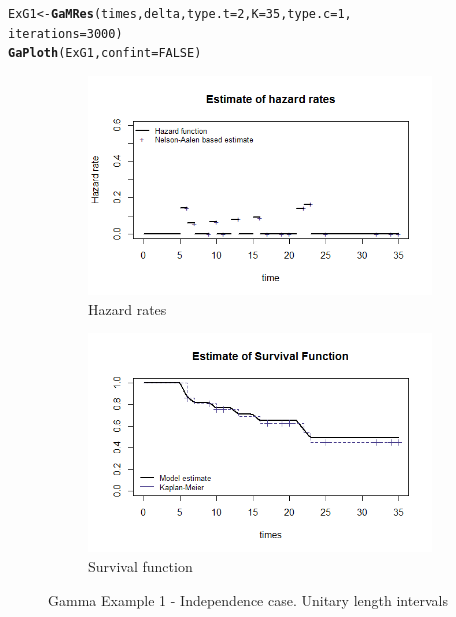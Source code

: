\documentclass[letterpaper]{article}\usepackage[]{graphicx}\usepackage[]{xcolor}
\makeatletter
\newcommand{\hlnum}[1]{\textcolor[rgb]{0.686,0.059,0.569}{#1}}%
\newcommand{\hlstd}[1]{\textcolor[rgb]{0.345,0.345,0.345}{#1}}%
\newcommand{\hlkwb}[1]{\textcolor[rgb]{0.69,0.353,0.396}{#1}}%
\newcommand{\hlkwc}[1]{\textcolor[rgb]{0.333,0.667,0.333}{#1}}%
\newcommand{\hlkwd}[1]{\textcolor[rgb]{0.737,0.353,0.396}{\textbf{#1}}}%
\newenvironment{kframe}{%
 \def\at@end@of@kframe{}%
 \ifinner\ifhmode%
  \def\at@end@of@kframe{\end{minipage}}%
  \begin{minipage}{\columnwidth}%
 \fi\fi%
 \def\FrameCommand##1{\hskip\@totalleftmargin \hskip-\fboxsep
 \colorbox{shadecolor}{##1}\hskip-\fboxsep
     \hskip-\linewidth \hskip-\@totalleftmargin \hskip\columnwidth}%
 \MakeFramed {\advance\hsize-\width
   \@totalleftmargin\z@ \linewidth\hsize
   \@setminipage}}%
 {\par\unskip\endMakeFramed%
 \at@end@of@kframe}
\newenvironment{knitrout}{}{} %
\makeatother
\begin{document}
\begin{knitrout}
\color{fgcolor}\begin{kframe}
\begin{alltt}
\hlstd{ExG1} \hlkwb{<-} \hlkwd{GaMRes}\hlstd{(times, delta,} \hlkwc{type.t} \hlstd{=} \hlnum{2}\hlstd{,} \hlkwc{K} \hlstd{=} \hlnum{35}\hlstd{,} \hlkwc{type.c} \hlstd{=} \hlnum{1}\hlstd{,}
               \hlkwc{iterations} \hlstd{=} \hlnum{3000}\hlstd{)}
\hlkwd{GaPloth}\hlstd{(ExG1,} \hlkwc{confint} \hlstd{=} \hlnum{FALSE}\hlstd{)}
\end{alltt}
\end{kframe}
\end{knitrout}
\begin{figure}
  \centering
  \begin{subfigure}[a]{\textwidth}\centering
    \includegraphics[width=\textwidth]{G11.png}
    \caption{Hazard rates}
  \end{subfigure}
  \begin{subfigure}[b]{\textwidth}\centering
    \includegraphics[width=\textwidth]{G12.png}
    \caption{Survival function}
  \end{subfigure}
  \caption{Gamma Example 1 - Independence case. Unitary length intervals}
  \label{fig:G1}
\end{figure}
\end{document}
